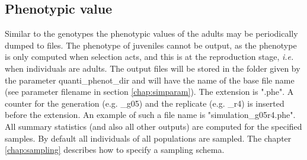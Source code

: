 \documentclass[letterpaper,12pt,oneside]{book}
\begin{document}
\subsection{Phenotypic value}\label{phenoQuanti}
Similar to the genotypes the phenotypic values of the adults may be periodically dumped to files. The phenotype of juveniles cannot be output, as the phenotype is only computed when selection acts, and this is at the reproduction stage, \textit{i.e.} when individuals are adults. The output files will be stored in the folder given by the parameter \textsf{quanti\_phenot\_dir} and will have the name of the base file name (see parameter \textsf{filename} in section \ref{chap:simparam}). The extension is ".phe". A counter for the generation (e.g. \_g05) and the replicate (e.g. \_r4) is inserted before the extension. An example of such a file name is \textsf{"simulation\_g05r4.phe"}. All summary statistics (and also all other outputs) are computed for the specified samples. By default all individuals of all populations are sampled. The chapter \ref{chap:sampling} describes how to specify a sampling schema.
\end{document}
